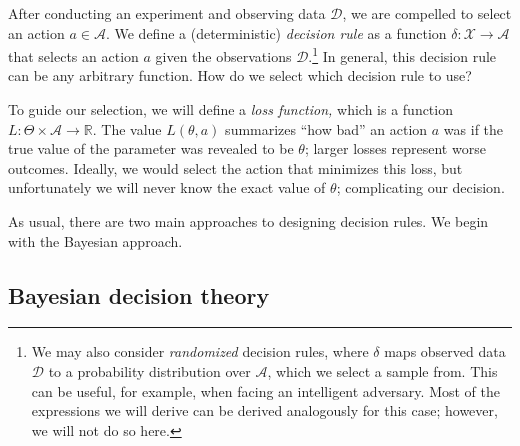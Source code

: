 \documentclass{article}
\newcommand{\mc}[1]{\mathcal{#1}}
\newcommand{\data}{\mc{D}}
\newcommand{\R}{\mathbb{R}}
\begin{document}
After conducting an experiment and observing data $\data$, we are
compelled to select an action $a \in \mc{A}$.  We define a
(deterministic) \emph{decision rule} as a function $\delta\colon
\mc{X} \to \mc{A}$ that selects an action $a$ given the observations
$\data$.\footnote{We may also consider \emph{randomized} decision rules,
  where $\delta$ maps observed data $\data$ to a probability
  distribution over $\mc{A}$, which we select a sample from.  This can
  be useful, for example, when facing an intelligent adversary.  Most
  of the expressions we will derive can be derived analogously for
  this case; however, we will not do so here.}  In general, this
decision rule can be any arbitrary function.  How do we select which
decision rule to use?

To guide our selection, we will define a \emph{loss function,} which
is a function $L\colon \Theta \times \mc{A} \to \R$.  The value
$L(\theta, a)$ summarizes ``how bad'' an action $a$ was if the true
value of the parameter was revealed to be $\theta$; larger losses
represent worse outcomes.  Ideally, we would select the action that
minimizes this loss, but unfortunately we will never know the exact
value of $\theta$; complicating our decision.

As usual, there are two main approaches to designing decision rules.
We begin with the Bayesian approach.

\subsection*{Bayesian decision theory}
\end{document}
